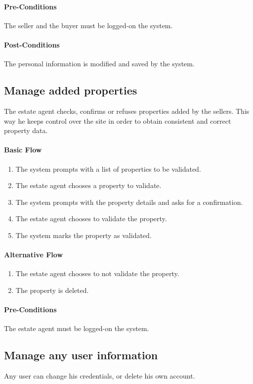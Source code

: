 \documentclass[a4paper,12pt]{article}
\begin{document}
\paragraph{Pre-Conditions}
The seller and the buyer must be logged-on the system.
\paragraph{Post-Conditions}
The personal information is modified and saved by the system.

\subsection{Manage added properties}
The estate agent checks, confirms or refuses properties added by the sellers. This way he keeps control over the site in order to obtain consistent and correct property data.
\paragraph{Basic Flow}
\begin{enumerate}
\item The system prompts with a list of properties to be validated.
\item The estate agent chooses a property to validate.
\item The system prompts with the property details and asks for a confirmation.
\item The estate agent chooses to validate the property.
\item The system marks the property as validated.
\end{enumerate}
\paragraph{Alternative Flow}
\begin{enumerate}
\item The estate agent chooses to not validate the property.
\item The property is deleted.
\end{enumerate}
\paragraph{Pre-Conditions}
The estate agent must be logged-on the system.


\subsection{Manage any user information}
Any user can change his credentials, or delete his own account.
\end{document}

